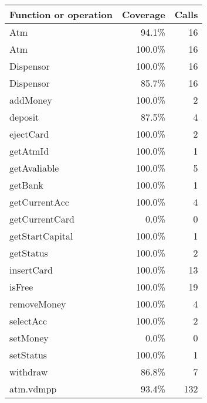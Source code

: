 \documentclass[a4paper]{article}
\begin{document}
\bigskip
\begin{longtable}{|l|r|r|}
\hline
Function or operation & Coverage & Calls \\
\hline
\hline
Atm & 94.1\% & 16 \\
\hline
Atm & 100.0\% & 16 \\
\hline
Dispensor & 100.0\% & 16 \\
\hline
Dispensor & 85.7\% & 16 \\
\hline
addMoney & 100.0\% & 2 \\
\hline
deposit & 87.5\% & 4 \\
\hline
ejectCard & 100.0\% & 2 \\
\hline
getAtmId & 100.0\% & 1 \\
\hline
getAvaliable & 100.0\% & 5 \\
\hline
getBank & 100.0\% & 1 \\
\hline
getCurrentAcc & 100.0\% & 4 \\
\hline
getCurrentCard & 0.0\% & 0 \\
\hline
getStartCapital & 100.0\% & 1 \\
\hline
getStatus & 100.0\% & 2 \\
\hline
insertCard & 100.0\% & 13 \\
\hline
isFree & 100.0\% & 19 \\
\hline
removeMoney & 100.0\% & 4 \\
\hline
selectAcc & 100.0\% & 2 \\
\hline
setMoney & 0.0\% & 0 \\
\hline
setStatus & 100.0\% & 1 \\
\hline
withdraw & 86.8\% & 7 \\
\hline
\hline
atm.vdmpp & 93.4\% & 132 \\
\hline
\end{longtable}
\end{document}
